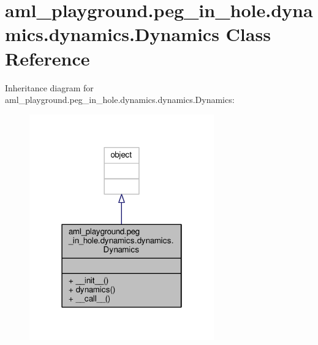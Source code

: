 \hypertarget{classaml__playground_1_1peg__in__hole_1_1dynamics_1_1dynamics_1_1_dynamics}{\section{aml\-\_\-playground.\-peg\-\_\-in\-\_\-hole.\-dynamics.\-dynamics.\-Dynamics Class Reference}
\label{classaml__playground_1_1peg__in__hole_1_1dynamics_1_1dynamics_1_1_dynamics}
}


Inheritance diagram for aml\-\_\-playground.\-peg\-\_\-in\-\_\-hole.\-dynamics.\-dynamics.\-Dynamics\-:
\nopagebreak
\begin{figure}[H]
\begin{center}
\leavevmode
\includegraphics[width=226pt]{classaml__playground_1_1peg__in__hole_1_1dynamics_1_1dynamics_1_1_dynamics__inherit__graph}
\end{center}
\end{figure}


